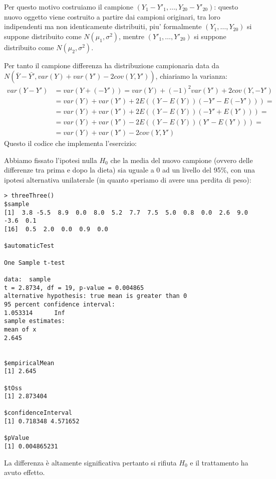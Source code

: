 Per questo motivo costruiamo il campione $(Y_1-Y'_1, \ldots,
Y_{20}-Y'_{20})$: questo nuovo oggetto viene costruito a partire dai
campioni originari, tra loro indipendenti ma non identicamente
distribuiti, piu' formalmente $(Y_1, \ldots, Y_{20})$ si suppone
distribuito come $N(\mu_1, \sigma^2)$, mentre $(Y'_1, \ldots,
Y'_{20})$ si suppone distribuito come $N(\mu_2, \sigma^2)$.

Per tanto il campione differenza ha distribuzione campionaria data da
$N(\bar{Y} - \bar{Y'}, var(Y) + var(Y') -2cov(Y, Y'))$, chiariamo la
varianza:
\begin{displaymath}
  \begin{split}
    var(Y - Y') &= var(Y + (-Y')) = var(Y) + (-1)^2var(Y') +
    2cov(Y,-Y') \\
    &= var(Y) + var(Y') + 2E\left((Y-E(Y))(-Y'-E(-Y')) \right) = \\
    &= var(Y) + var(Y') + 2E\left((Y-E(Y))(-Y'+E(Y')) \right) = \\
    &= var(Y) + var(Y') - 2E\left((Y-E(Y))(Y'-E(Y')) \right) = \\
    &= var(Y) + var(Y') - 2cov(Y,Y')
  \end{split}
\end{displaymath}
Questo il codice che implementa l'esercizio:

Abbiamo fissato l'ipotesi nulla $H_0$ che la media del nuovo campione
(ovvero delle differenze tra prima e dopo la dieta) sia uguale a 0 ad
un livello del 95\%, con una ipotesi alternativa unilaterale (in
quanto speriamo di avere una perdita di peso):
\begin{lstlisting}
> threeThree()
$sample
[1]  3.8 -5.5  8.9  0.0  8.0  5.2  7.7  7.5  5.0  0.8  0.0  2.6  9.0 -3.6  0.1
[16]  0.5  2.0  0.0  0.9  0.0

$automaticTest

One Sample t-test

data:  sample 
t = 2.8734, df = 19, p-value = 0.004865
alternative hypothesis: true mean is greater than 0 
95 percent confidence interval:
1.053314      Inf 
sample estimates:
mean of x 
2.645 


$empiricalMean
[1] 2.645

$tOss
[1] 2.873404

$confidenceInterval
[1] 0.718348 4.571652

$pValue
[1] 0.004865231
\end{lstlisting}
La differenza \`e altamente significativa pertanto si rifiuta $H_0$ e
il trattamento ha avuto effetto.
